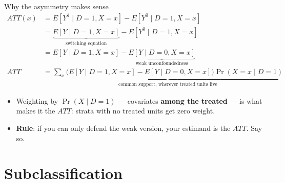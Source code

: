 \documentclass[
  11pt,
  ignorenonframetext,
  aspectratio=169,
]{beamer}
\providecommand{\tightlist}{%
  \setlength{\itemsep}{0pt}\setlength{\parskip}{0pt}}
\begin{document}
\begin{frame}{Why the asymmetry makes sense}
\protect{}\label{why-the-asymmetry-makes-sense}
\[
\begin{aligned}
ATT(x) &= E[Y^1 \mid D{=}1, X{=}x] - E[Y^0 \mid D{=}1, X{=}x] \\[0.3em]
       &= \underbrace{E[Y \mid D{=}1, X{=}x]}_{\text{switching equation}} - E[Y^0 \mid D{=}1, X{=}x] \\[0.3em]
       &= E[Y \mid D{=}1, X{=}x] - \underbrace{E[Y \mid D{=}0, X{=}x]}_{\text{weak unconfoundedness}} \\[0.4em]
ATT    &= \underbrace{\sum_x \Big( E[Y \mid D{=}1, X{=}x] - E[Y \mid D{=}0, X{=}x] \Big)\Pr(X{=}x \mid D{=}1)}_{\text{common support, wherever treated units live}}
\end{aligned}
\]

\begin{itemize}
\tightlist
\item
  Weighting by \(\Pr(X \mid D{=}1)\) --- covariates \textbf{among the
  treated} --- is what makes it the \(ATT\): strata with no treated
  units get zero weight.
\item
  \textbf{Rule}: if you can only defend the weak version, your estimand
  is the \(ATT\). Say so.
\end{itemize}
\end{frame}

\section{Subclassification}\label{subclassification}
\end{document}
